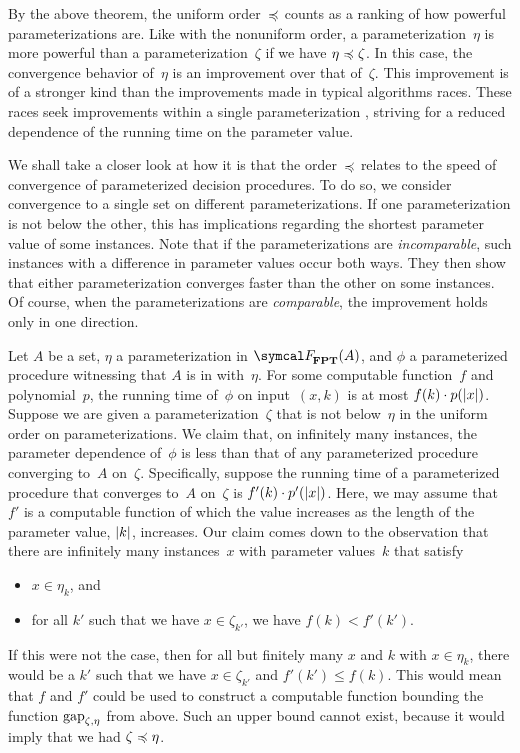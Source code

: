 By the above theorem, the uniform order~$\preccurlyeq$ counts as a ranking of how powerful parameterizations are.
Like with the nonuniform order, a parameterization~$\eta$ is more powerful than a parameterization~$\zeta$ if we have $\eta \preccurlyeq \zeta$.
In this case, the convergence behavior of~$\eta$ is an improvement over that of~$\zeta$.
This improvement is of a stronger kind than the improvements made in typical algorithms races.
These races seek improvements within a single parameterization \parencite{komusiewicz2012new,fellows2013towards}, striving for a reduced dependence of the running time on the parameter value.
\begin{example}
  We shall take a closer look at how it is that the order~$\preccurlyeq$ relates to the speed of convergence of parameterized decision procedures.
  To do so, we consider convergence to a single set on different parameterizations.
  If one parameterization is not below the other, this has implications regarding the shortest parameter value of some instances.
  Note that if the parameterizations are \emph{incomparable}, such instances with a difference in parameter values occur both ways.
  They then show that either parameterization converges faster than the other on some instances.
  Of course, when the parameterizations are \emph{comparable}, the improvement holds only in one direction.

  Let $A$ be a set, $\eta$ a parameterization in $\calF_\cl{FPT}(A)$, and $\phi$ a parameterized procedure witnessing that $A$ is in  with~$\eta$.
  For some computable function~$f$ and polynomial~$p$, the running time of~$\phi$ on input~$(x, k)$ is at most $f(k) \cdot p({\lvert x\rvert})$.
  Suppose we are given a parameterization~$\zeta$ that is not below~$\eta$ in the uniform order on parameterizations.
  We claim that, on infinitely many instances, the parameter dependence of~$\phi$ is less than that of any parameterized procedure converging to~$A$ on~$\zeta$.
  Specifically, suppose the running time of a parameterized procedure that converges to~$A$ on~$\zeta$ is $f'(k) \cdot p'({\lvert x\rvert})$.
  Here, we may assume that $f'$ is a computable function of which the value increases as the length of the parameter value, ${\lvert k\rvert}$, increases.
  Our claim comes down to the observation that there are infinitely many instances~$x$ with parameter values~$k$ that satisfy
  \begin{itemize}
  \item $x \in \eta_k$, and
  \item for all $k'$ such that we have $x \in \zeta_{k'}$, we have $f(k) < f'(k')$.
  \end{itemize}
  If this were not the case, then for all but finitely many $x$ and $k$ with $x \in \eta_k$, there would be a $k'$ such that we have $x \in \zeta_{k'}$ and $f'(k') \le f(k)$.
  This would mean that $f$ and $f'$ could be used to construct a computable function bounding the function $\operatorname{gap}_{\zeta, \eta}$ from above.
  Such an upper bound cannot exist, because it would imply that we had $\zeta \preccurlyeq \eta$.
\end{example}


